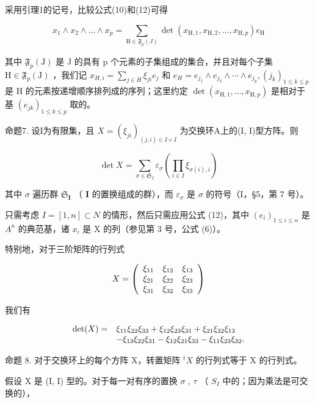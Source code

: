 采用引理1的记号，比较公式(10)和(12)可得

\[
x _ {1} \wedge x _ {2} \wedge \dots \wedge x _ {p} = \sum_ {\mathrm{H} \in \mathfrak {F} _ {p} (J)} \det (x _ {\mathrm{H}, 1}, x _ {\mathrm{H}, 2}, \dots , x _ {\mathrm{H}, p}) e _ {\mathrm{H}}\tag{13}
\]

其中 \(\mathfrak{F}_{p}(\mathrm{J})\) 是 J 的具有 p 个元素的子集组成的集合，并且对每个子集 \(\mathrm{H}\in\mathfrak{F}_{p}(\mathrm{J})\) ，我们记 \(x_{H,i}=\sum_{j\in H}\xi_{ji}e_{j}\) 和 \(e_{H}=e_{j_{1}}\wedge e_{j_{2}}\wedge\cdots\wedge e_{j_{p}},(j_{k})_{1\leqslant k\leqslant p}\) 是 H 的元素按递增顺序排列成的序列；这里约定 \(\det(x_{\mathrm{H},1},\ldots,x_{\mathrm{H},p})\) 是相对于基 \((e_{jk})_{1\leqslant k\leqslant p}\) 取的。

命题7. 设I为有限集，且 \(X = (\xi_{ji})_{(j, i) \in I \times I}\) 为交换环A上的(I, I)型方阵。则

\[
\det X = \sum_ {\sigma \in \mathfrak {S} _ {I}} \varepsilon_ {\sigma} \left(\prod_ {i \in I} \xi_ {\sigma (i), i}\right)\tag{14}
\]

其中 \(\sigma\) 遍历群 \(\mathfrak{S}_{\mathbf{I}}\) （ \(\mathbf{I}\) 的置换组成的群），而 \(\varepsilon_{\sigma}\) 是 \(\sigma\) 的符号（I，§5，第 7 号）。

只需考虑 \(I = [1, n] \subset N\) 的情形，然后只需应用公式 (12)，其中 \((e_{i})_{1 \leqslant i \leqslant n}\) 是 \(A^{n}\) 的典范基，诸 \(x_{i}\) 是 X 的列（参见第 3 号，公式 (6)）。

特别地，对于三阶矩阵的行列式

\[
X = \left( \begin{array}{c c c} \xi_ {1 1} & \xi_ {1 2} & \xi_ {1 3} \\ \xi_ {2 1} & \xi_ {2 2} & \xi_ {2 3} \\ \xi_ {3 1} & \xi_ {3 2} & \xi_ {3 3} \end{array} \right)
\]

我们有

\[
\begin{array}{r l} \det (X) = & \xi_ {1 1} \xi_ {2 2} \xi_ {3 3} + \xi_ {1 2} \xi_ {2 3} \xi_ {3 1} + \xi_ {2 1} \xi_ {3 2} \xi_ {1 3} \\ & - \xi_ {1 3} \xi_ {2 2} \xi_ {3 1} - \xi_ {1 2} \xi_ {2 1} \xi_ {3 3} - \xi_ {1 1} \xi_ {2 3} \xi_ {3 2}. \end{array}
\]

命题 8. 对于交换环上的每个方阵 X，转置矩阵 \(^{t}X\) 的行列式等于 X 的行列式。

假设 X 是 (I, I) 型的。对于每一对有序的置换 \(\sigma\) , \(\tau\) （ \(S_{I}\) 中的；因为乘法是可交换的），

